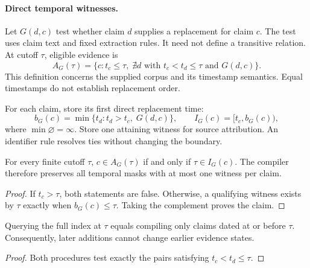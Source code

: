 
\paragraph{Direct temporal witnesses.}
Let $G(d,c)$ test whether claim $d$ supplies a replacement for claim $c$.
The test uses claim text and fixed extraction rules.
It need not define a transitive relation.
At cutoff $\tau$, eligible evidence is
\begin{equation}
 A_G(\tau)=\{c:t_c\leq\tau,\;\nexists d\text{ with }t_c<t_d\leq\tau\text{ and }G(d,c)\}.
 \label{eq:direct-eligibility}
\end{equation}
This definition concerns the supplied corpus and its timestamp semantics.
Equal timestamps do not establish replacement order.

For each claim, store its first direct replacement time:
\begin{equation}
 b_G(c)=\min\{t_d:t_d>t_c,\;G(d,c)\},\qquad
 I_G(c)=[t_c,b_G(c)),
 \label{eq:direct-certificate}
\end{equation}
where $\min\varnothing=\infty$.
Store one attaining witness for source attribution.
An identifier rule resolves ties without changing the boundary.

\begin{theorem}
\label{thm:all-cutoff}
For every finite cutoff $\tau$, $c\in A_G(\tau)$ if and only if $\tau\in I_G(c)$.
The compiler therefore preserves all temporal masks with at most one witness per claim.
\end{theorem}
\begin{proof}
If $t_c>\tau$, both statements are false.
Otherwise, a qualifying witness exists by $\tau$ exactly when $b_G(c)\leq\tau$.
Taking the complement proves the claim.
\end{proof}

\begin{corollary}
\label{cor:prefix}
Querying the full index at $\tau$ equals compiling only claims dated at or before $\tau$.
Consequently, later additions cannot change earlier evidence states.
\end{corollary}
\begin{proof}
Both procedures test exactly the pairs satisfying $t_c<t_d\leq\tau$.
\end{proof}

